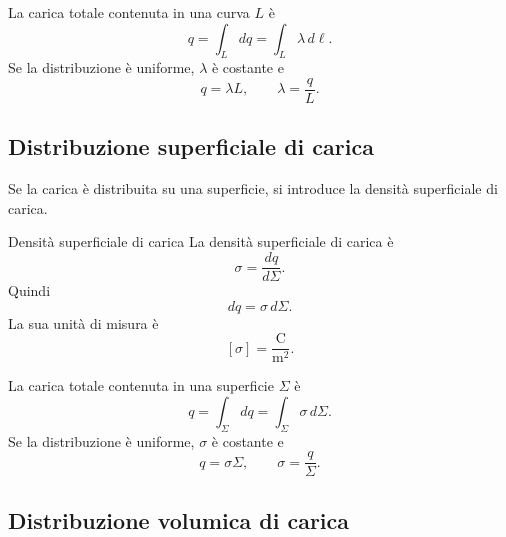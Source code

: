 \documentclass[a4paper]{article}
\begin{document}
La carica totale contenuta in una curva \(L\) è
\[
    q=\int_L dq=\int_L \lambda\,d\ell.
\]
Se la distribuzione è uniforme, \(\lambda\) è costante e
\[
    q=\lambda L,
    \qquad
    \lambda=\frac{q}{L}.
\]

\begin{center}
\end{center}

\subsection{Distribuzione superficiale di carica}

Se la carica è distribuita su una superficie, si introduce la densità superficiale di carica.

\begin{snippetdefinition}{Densità superficiale di carica}
    La densità superficiale di carica è
    \[
        \sigma=\frac{dq}{d\Sigma}.
    \]
    Quindi
    \[
        dq=\sigma\,d\Sigma.
    \]
    La sua unità di misura è
    \[
        [\sigma]=\frac{\mathrm{C}}{\mathrm{m}^2}.
    \]
\end{snippetdefinition}

La carica totale contenuta in una superficie \(\Sigma\) è
\[
    q=\int_\Sigma dq=\int_\Sigma \sigma\,d\Sigma.
\]
Se la distribuzione è uniforme, \(\sigma\) è costante e
\[
    q=\sigma\Sigma,
    \qquad
    \sigma=\frac{q}{\Sigma}.
\]

\begin{center}
\end{center}

\subsection{Distribuzione volumica di carica}
\end{document}
